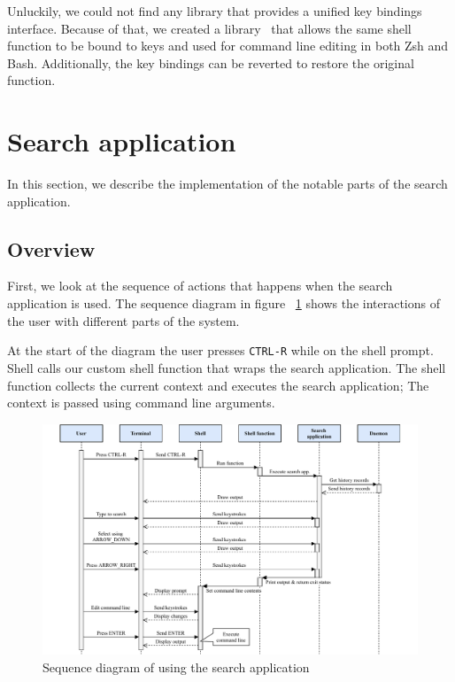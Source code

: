 \documentclass[thesis=M,english]{FITthesis}[2012/10/20]
\newcommand{\tmpframe}[1]{\fbox{#1}}
\renewcommand{\tmpframe}[1]{#1}
\let\myCite\cite
\renewcommand\cite{\unskip~\myCite}
\let\myRef\ref
\renewcommand\ref{\unskip~\myRef}
\begin{document}
Unluckily, we could not find any library that provides a unified key bindings interface. Because of that, we created a library\cite{lib-bash-zsh-compat-widgets} that allows the same shell function to be bound to keys and used for command line editing in both Zsh and Bash. Additionally, the key bindings can be reverted to restore the original function.



\section{Search application}

In this section, we describe the implementation of the notable parts of the search application. 

\subsection{Overview}

First, we look at the sequence of actions that happens when the search application is used. The sequence diagram in figure \ref{impl-search-app-sequence} shows the interactions of the user with different parts of the system.

At the start of the diagram the user presses \verb|CTRL-R| while on the shell prompt. Shell calls our custom shell function that wraps the search application. The shell function collects the current context and executes the search application; The context is passed using command line arguments. 


\begin{figure}
\centering
  \tmpframe{\includegraphics[angle=90,origin=c,width=\linewidth]{figures/implementation/thesis-impl-search-app-sequence-PADDING.pdf}}
  \caption{Sequence diagram of using the search application}
  \label{impl-search-app-sequence}
\end{figure}
\end{document}
